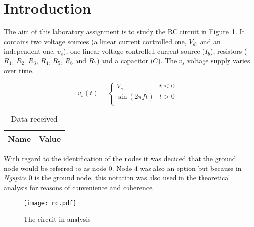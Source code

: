 \section{Introduction}
\label{sec:introduction}


The aim of this laboratory assignment is to study the RC circuit in Figure~\ref{fig:rc}. It contains two voltage sources (a linear current controlled one, $V_d$, and an independent one, $v_s$), one linear voltage controlled  current source ($I_b$), resistors ($R_1$, $R_2$, $R_3$, $R_4$, $R_5$, $R_6$ and $R_7$) and a capacitor ($C$).
The $v_s$ voltage supply varies over time.

\[ 
v_s (t)= \left\{
\begin{array}{ll}
  V_s & t \leq 0 \\
  \sin(2 \pi f t) & t > 0\\
\end{array} 
\right. 
\]

\begin{table}[hbt!]
  \centering
  \begin{tabular}{|c|c|}
    \hline    
    {\bf Name} & {\bf Value} \\ \hline
    
  \end{tabular}
  \caption{Data received}
  \label{tab:data}
\end{table}



With regard to the identification of the nodes it was decided that the ground node would be referred to as node 0. Node 4 was also an option but because in \textit{Ngspice} 0 is the ground node, this notation was also used in the theoretical analysis for reasons of convenience and coherence.



\begin{figure}[h] \centering
\texttt{[image: rc.pdf]}
\caption{The circuit in analysis}
\label{fig:rc}
\end{figure}




%    



